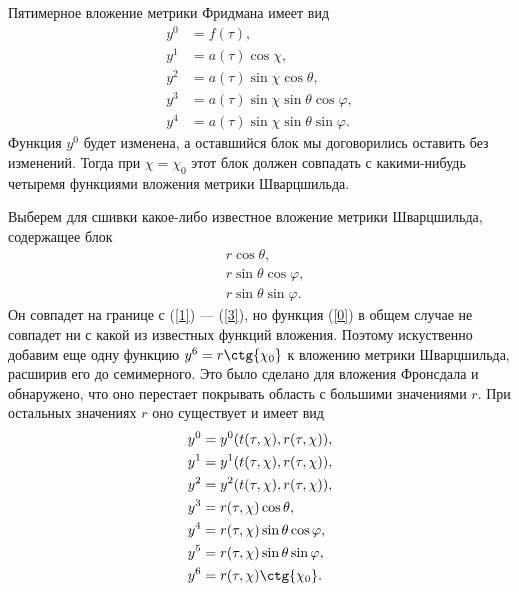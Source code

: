 \documentclass[12pt]{article}
\begin{document}
Пятимерное вложение метрики Фридмана имеет вид
\begin{align}
	y^0 &= f(\tau), \\
\label{0}	y^1 &= a(\tau) \cos{\chi}, \\
\label{1}	y^2 &= a(\tau) \sin{\chi} \cos{\theta}, \\
\label{2}	y^3 &= a(\tau) \sin{\chi} \sin{\theta} \cos{\varphi}, \\
\label{3}	y^4 &= a(\tau) \sin{\chi} \sin{\theta} \sin{\varphi}.
\end{align}
Функция $y^0$ будет изменена, а оставшийся блок мы договорились оставить без изменений. Тогда при $\chi = \chi_0$ этот блок должен совпадать с какими-нибудь четыремя функциями вложения метрики Шварцшильда. 

Выберем для сшивки какое-либо известное вложение метрики Шварцшильда, содержащее блок
\begin{align}
	&r \cos{\theta}, \\
	&r \sin{\theta} \cos{\varphi}, \\
	&r \sin{\theta} \sin{\varphi}.
\end{align}
Он совпадет на границе с (\ref{1}) --- (\ref{3}), но функция (\ref{0}) в общем случае не совпадет ни с какой из известных функций вложения. Поэтому искуственно добавим еще одну функцию $y^6 = r \ctg{\chi_0}$ к вложению метрики Шварцшильда, расширив его до семимерного. Это было сделано для вложения Фронсдала и обнаружено, что оно перестает покрывать область с большими значениями $r$. При остальных значениях $r$ оно существует и имеет вид
\begin{align}
\label{4}	&y^0 = y^0(t(\tau, \chi), r(\tau, \chi)), \\
\label{5}	&y^1 = y^1(t(\tau, \chi), r(\tau, \chi)), \\
\label{6}	&y^2 = y^2(t(\tau, \chi), r(\tau, \chi)), \\
	&y^3 = r(\tau, \chi) \cos{\theta}, \\
	&y^4 = r(\tau, \chi) \sin{\theta} \cos{\varphi}, \\
	&y^5 = r(\tau, \chi) \sin{\theta} \sin{\varphi}, \\
\label{7}	&y^6 = r(\tau, \chi) \ctg{\chi_0}.
\end{align}
\end{document}
